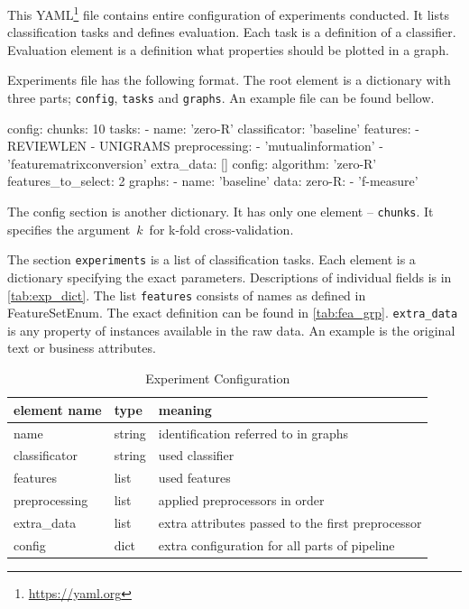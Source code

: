 This YAML\footnote{\url{https://yaml.org}}  file contains entire configuration of experiments conducted.
It lists classification tasks and defines evaluation.
Each task is a definition of a classifier.
Evaluation element is a definition what properties should be plotted in a graph.

Experiments file has the following format.
The root element is a dictionary with three parts;
\texttt{config}, \texttt{tasks} and \texttt{graphs}.
An example file can be found bellow.

\begin{code}
config:
  chunks: 10
tasks:
  - name: 'zero-R'
    classificator: 'baseline'
    features:
      - REVIEWLEN
      - UNIGRAMS
    preprocessing:
      - 'mutualinformation'
      - 'featurematrixconversion'
    extra_data: []
    config:
      algorithm: 'zero-R'
      features_to_select: 2
graphs:
  - name: 'baseline'
    data:
      zero-R:
        - 'f-measure'
\end{code}

The config section is another dictionary.
It has only one element -- \texttt{chunks}.
It specifies the argument~$k$~for k-fold cross-validation.

The section \texttt{experiments} is a list of classification tasks.
Each element is a dictionary specifying the exact parameters.
Descriptions of individual fields is in \autoref{tab:exp_dict}.
The list \texttt{features} consists of names as defined in FeatureSetEnum.
The exact definition can be found in \autoref{tab:fea_grp}.
\texttt{extra\_data} is any property of instances available in the raw data.
An example is the original text or business attributes.

\begin{table}[h]

\centering
\begin{tabular}{lll}
\toprule
\textbf{element name} & \textbf{type} & \textbf{meaning}\\
\midrule
name 			& string	& identification referred to in graphs\\
classificator 	& string	& used classifier\\
features 		& list		& used features \\
preprocessing 	& list		& applied preprocessors in order\\
extra\_data 	& list 		& extra attributes passed to the first preprocessor \\
config			& dict		& extra configuration for all parts of pipeline \\
\bottomrule
\end{tabular}

\caption{Experiment Configuration}\label{tab:exp_dict}
\end{table}



